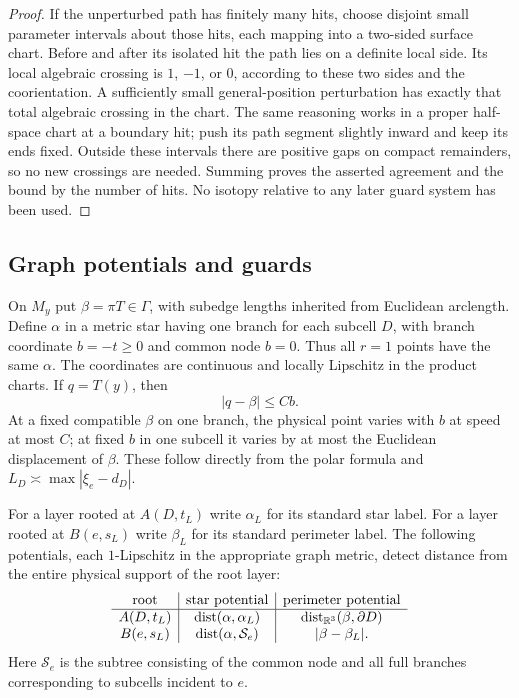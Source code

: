 \begin{proof}
If the unperturbed path has finitely many hits, choose disjoint small
parameter intervals about those hits, each mapping into a two-sided surface
chart.  Before and after its isolated hit the path lies on a definite local
side.  Its local algebraic crossing is $1$, $-1$, or $0$, according to these
two sides and the coorientation.  A sufficiently small general-position
perturbation has exactly that total algebraic crossing in the chart.  The
same reasoning works in a proper half-space chart at a boundary hit; push
its path segment slightly inward and keep its ends fixed.  Outside these
intervals there are positive gaps on compact remainders, so no new crossings
are needed.  Summing proves the asserted agreement and the bound by the
number of hits.  No isotopy relative to any later guard system has been
used.
\end{proof}


\subsection{Graph potentials and guards}

On $M_y$ put $\beta=\pi T\in\Gamma$, with subedge lengths inherited
from Euclidean arclength.  Define $\alpha$ in a metric star having one
branch for each subcell $D$, with branch coordinate $b=-t\geq0$ and
common node $b=0$.  Thus all $r=1$ points have the same $\alpha$.
The coordinates are continuous and locally Lipschitz in the product
charts.  If $q=T(y)$, then
\begin{equation}\label{wl:graph-physical}
 |q-\beta|\leq Cb.
\end{equation}
At a fixed compatible $\beta$ on one branch, the physical point varies
with $b$ at speed at most $C$; at fixed $b$ in one subcell it varies by
at most the Euclidean displacement of $\beta$.  These follow directly
from the polar formula and $L_D\asymp\max|\xi_e-d_D|$.

For a layer rooted at $A(D,t_L)$ write $\alpha_L$ for its standard
star label.  For a layer rooted at $B(e,s_L)$ write $\beta_L$ for its
standard perimeter label.  The following potentials, each
$1$-Lipschitz in the appropriate graph metric, detect distance from
the entire physical support of the root layer:
\begin{equation}\label{wl:potentials}
\begin{array}{c|c|c}
 \hbox{root}&\hbox{star potential}&\hbox{perimeter potential}\\ \hline
 A(D,t_L)&\operatorname{dist}(\alpha,\alpha_L)&\operatorname{dist}_{\mathbb R^3}(\beta,\partial D)\\
 B(e,s_L)&\operatorname{dist}(\alpha,\mathcal S_e)&|\beta-\beta_L|.
\end{array}
\end{equation}
Here $\mathcal S_e$ is the subtree consisting of the common node and
all full branches corresponding to subcells incident to $e$.

